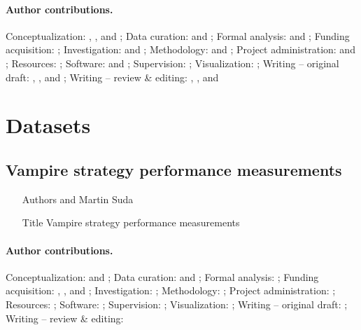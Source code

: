 \documentclass{article}
\begin{document}
\paragraph{Author contributions.}
Conceptualization:            \MS{}, \KC{}, and \FB{};
Data curation:                \MS{} and \KC{};
Formal analysis:              \MS{} and \KC{};
Funding acquisition:          \MS{};
Investigation:                \KC{} and \MS{};
Methodology:                  \MS{} and \KC{};
Project administration:       \MS{} and \FB{};
Resources:                    \JU{};
Software:                     \KC{} and \MS{};
Supervision:                  \MS{};
Visualization:                \MS{};
Writing -- original draft:    \MS{}, \KC{}, and \FB{};
Writing -- review \& editing: \FB{}, \MS{}, and \KC{}

\section{Datasets}

\subsection{Vampire strategy performance measurements \cite{bartek10814478}}

\begin{itemize}
\item[Authors]  and Martin Suda
\item[Title] Vampire strategy performance measurements
\end{itemize}

\paragraph{Author contributions.}
Conceptualization:            \FB{} and \MS{};
Data curation:                \FB{} and \MS{};
Formal analysis:              \FB{};
Funding acquisition:          \MS{}, \JU{}, and \FB{};
Investigation:                \FB{};
Methodology:                  \FB{};
Project administration:       \MS{};
Resources:                    \JU{};
Software:                     \FB{};
Supervision:                  \MS{};
Visualization:                \FB{};
Writing -- original draft:    \FB{};
Writing -- review \& editing: \MS{}


\end{document}
